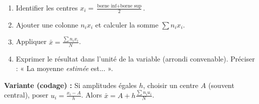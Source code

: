 \documentclass[11pt]{article}
\begin{document}
\begin{methode}
\begin{enumerate}
    \item Identifier les centres $x_i = \frac{\text{borne inf} + \text{borne sup}}{2}$.
    \item Ajouter une colonne $n_i x_i$ et calculer la somme $\sum n_i x_i$.
    \item Appliquer $\bar{x} = \frac{\sum n_i x_i}{N}$.
    \item Exprimer le résultat dans l'unité de la variable (arrondi convenable). Préciser : « La moyenne \emph{estimée} est... ».
\end{enumerate}
\textbf{Variante (codage) :} Si amplitudes égales $h$, choisir un centre $A$ (souvent central), poser $u_i = \frac{x_i - A}{h}$. Alors $\bar{x} = A + h \frac{\sum n_i u_i}{N}$.
\end{methode}
\end{document}
